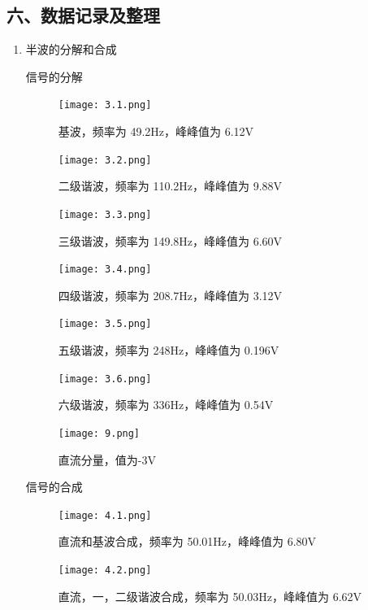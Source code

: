 \documentclass[dvipsnames, svgnames,a4paper,11pt]{article}
\begin{document}
\subsection*{六、数据记录及整理}
\begin{enumerate}
  \item 半波的分解和合成
    
    信号的分解
    \begin{figure}[htbp]
      \centering
      \begin{minipage}[t]{0.48\textwidth}
      \centering
      \texttt{[image: 3.1.png]}
      \caption{基波，频率为 49.2Hz，峰峰值为 6.12V}
      \end{minipage}
      \begin{minipage}[t]{0.48\textwidth}
      \centering
      \texttt{[image: 3.2.png]}
      \caption{二级谐波，频率为 110.2Hz，峰峰值为 9.88V}
      \end{minipage}

      \begin{minipage}[t]{0.48\textwidth}
      \centering
      \texttt{[image: 3.3.png]}
      \caption{三级谐波，频率为 149.8Hz，峰峰值为 6.60V}
      \end{minipage}
      \centering
      \begin{minipage}[t]{0.48\textwidth}
      \centering
      \texttt{[image: 3.4.png]}
      \caption{四级谐波，频率为 208.7Hz，峰峰值为 3.12V}
      \end{minipage}

      \begin{minipage}[t]{0.48\textwidth}
      \centering
      \texttt{[image: 3.5.png]}
      \caption{五级谐波，频率为 248Hz，峰峰值为 0.196V}
      \end{minipage}
      \begin{minipage}[t]{0.48\textwidth}
      \centering
      \texttt{[image: 3.6.png]}
      \caption{六级谐波，频率为 336Hz，峰峰值为 0.54V}
      \end{minipage}

      \begin{minipage}[t]{0.48\textwidth}
        \centering
        \texttt{[image: 9.png]}
        \caption{直流分量，值为-3V}
      \end{minipage}
    \end{figure}

    \newpage
    信号的合成
    \begin{figure}[htbp]
      \centering
      \begin{minipage}[t]{0.48\textwidth}
      \centering
      \texttt{[image: 4.1.png]}
      \caption{直流和基波合成，频率为 50.01Hz，峰峰值为 6.80V}
      \end{minipage}
      \begin{minipage}[t]{0.48\textwidth}
      \centering
      \texttt{[image: 4.2.png]}
      \caption{直流，一，二级谐波合成，频率为 50.03Hz，峰峰值为 6.62V}
      \end{minipage}


\end{figure}
\end{enumerate}
\end{document}
